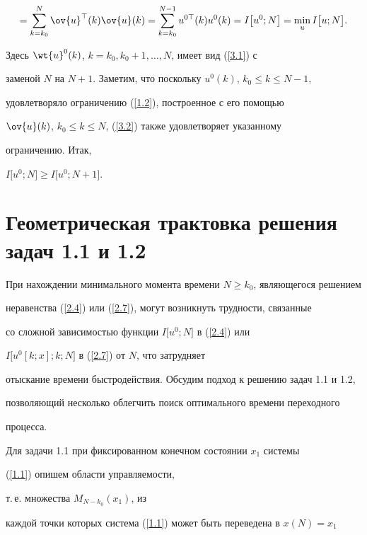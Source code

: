 \begin{pf}
\begin{multline*}
=\sum_{k=k_0}^{N} \ov{u}^{\top}(k) \ov{u}(k)


=\sum_{k=k_0}^{N-1} u^{0 \top}(k) u^0(k)=I\bigl[u^0; N\bigr]= \min_u


I\bigl[u; N\bigr] .


\end{multline*}


Здесь $\wt{u}^0(k)$, $k=k_0, k_0+1,\dotsc, N$, имеет вид (\ref{3.1}) с


заменой $N$ на $N+1$. Заметим, что поскольку $u^0(k)$, $k_0\le k\le N-1$,


удовлетворяло ограничению (\ref{1.2}), построенное с его помощью


$\ov{u}(k)$, $k_0\le k\le N$, (\ref{3.2}) также удовлетворяет указанному


ограничению. Итак,


$I\bigl[u^0; N\bigr]\ge I\bigl[u^0; N+1\bigr]$.


\end{pf}





\section{Геометрическая трактовка решения задач 1.1 и 1.2}





При нахождении минимального момента времени $N\ge k_0$, являющегося решением


неравенства (\ref{2.4}) или (\ref{2.7}), могут возникнуть трудности, связанные


со сложной зависимостью функции $I\bigl[u^0; N\bigr]$ в (\ref{2.4}) или


$I\bigl[u^0[k; x]; k; N\bigr]$ в (\ref{2.7}) от $N$, что затрудняет


отыскание времени быстродействия. Обсудим подход к решению задач 1.1 и 1.2,


позволяющий несколько облегчить поиск оптимального времени переходного


процесса.





Для задачи 1.1 при фиксированном конечном состоянии $x_1$ системы


(\ref{1.1}) опишем области управляемости,


т.\,е. множества $M_{N-k_0}(x_1)$, из


каждой точки которых система (\ref{1.1}) может быть переведена в $x(N)=x_1$



